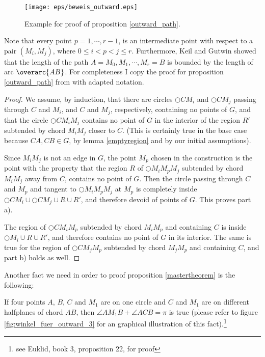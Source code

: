 \begin{figure}[h!]
\centering
\texttt{[image: eps/beweis\_outward.eps]}
\caption{Example for proof of proposition \ref{outward_path}.}
\label{fig:outward_path_beweis}
\end{figure}

Note that every point $p=1, \cdots, r-1 $, is an intermediate point with respect to a pair $(M_i, M_j) $, where $0\leq i < p <j \leq r  $.
Furthermore, Keil and Gutwin \cite{keil} showed that the length of the path $A =M_0, M_1, \cdots, M_r=B $ is bounded by the length of arc $\overarc{AB} $.
For completeness I copy the proof for proposition \ref{outward_path} from \cite{kanj} with adapted notation.
\begin{proof}

We assume, by induction, that there are circles $\bigcirc{CM_i} $ and $\bigcirc{CM_j} $ passing through $C $ and $M_i $, and $C $ and $M_j $, respectively, containing no points of $G $, and that the circle $\bigcirc{CM_iM_j} $ contains no point of $G $ in the interior of the region $R' $ subtended by chord $M_iM_j $ closer to $C $.
(This is certainly true in the base case because $CA, CB \in G $, by lemma \ref{emptyregion} and by our initial assumptions).

Since $M_iM_j $ is not an edge in $G $, the point $M_p $ chosen in the construction is the point with the property that the region $R $ of $\bigcirc{M_iM_pM_j} $ subtended by chord $M_iM_j $ away from $C $, contains no point of $G $. 
Then the circle passing through $C $ and $M_p $ and tangent to $\bigcirc{M_iM_pM_j} $ at $M_p $ is completely inside $\bigcirc{CM_i} \cup \bigcirc{CM_j} \cup R \cup R' $, and therefore devoid of points of $G $.
This proves part a).

The region of $\bigcirc{CM_iM_p} $ subtended by chord $M_iM_p $ and containing $C $ is inside $ \bigcirc{M_i} \cup R \cup R' $, and therefore contains no point of $G $ in its interior.
The same is true for the region of $\bigcirc{CM_jM_p} $ subtended by chord $M_jM_p $ and containing $C $, and part b) holds as well.
\end{proof}

Another fact we need in order to proof proposition \ref{mastertheorem} is the following:
\begin{fact}
\label{outward_3}
If four points $A $, $B $, $C $ and $M_1 $ are on one circle and $C $ and $M_1 $ are on different halfplanes of chord $AB $, then $\angle{AM_1B} + \angle{ACB} =\pi $ is true (please refer to figure \ref{fig:winkel_fuer_outward_3} for an graphical illustration of this fact).\footnote{see Euklid, book 3, proposition 22, for proof}
\end{fact}

